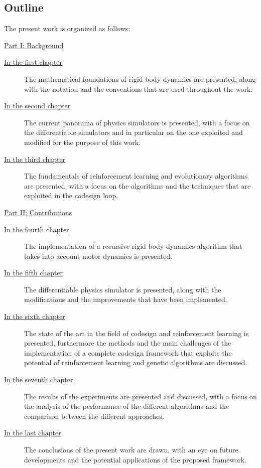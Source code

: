 \subsection*{Outline}

The present work is organized as follows:

\begin{description}

    \item{\hyperref[part:background]{Part I: Background}}

    \begin{description}
        \item[{\hyperref[chp:back_RBDynamics]{In the first chapter}}] The mathematical foundations of rigid body dynamics are presented, along with the notation and the conventions that are used throughout the work.
        \item[{\hyperref[chp:back_PhysicsSimulators]{In the second chapter}}] The current panorama of physics simulators is presented, with a focus on the differentiable simulators and in particular on the one exploited and modified for the purpose of this work.
        \item [{\hyperref[chp:back_RLGA]{In the third chapter}}] The fundamentals of reinforcement learning and evolutionary algorithms are presented, with a focus on the algorithms and the techniques that are exploited in the codesign loop.
    \end{description}

    \item{\hyperref[part:contributions]{Part II: Contributions}}

    \begin{description}
        \item[{\hyperref[chp:contrib_ABA]{In the fourth chapter}}] The implementation of a recursive rigid body dynamics algorithm that takes into account motor dynamics is presented.
        \item[{\hyperref[chp:contrib_JaxSim]{In the fifth chapter}}] The differentiable physics simulator is presented, along with the modifications and the improvements that have been implemented.
        \item[{\hyperref[chp:contrib_CodesignRL]{In the sixth chapter}}] The state of the art in the field of codesign and reinforcement learning is presented, furthermore the methods and the main challenges of the implementation of a complete codesign framework that exploits the potential of reinforcement learning and genetic algorithms are discussed.
        \item[{\hyperref[chp:contrib_ResultsDiscussion]{In the seventh chapter}}] The results of the experiments are presented and discussed, with a focus on the analysis of the performance of the different algorithms and the comparison between the different approaches.
        \item[{\hyperref[chp:contrib_Conclusions]{In the last chapter}}] The conclusions of the present work are drawn, with an eye on future developments and the potential applications of the proposed framework.
    \end{description}
\end{description}